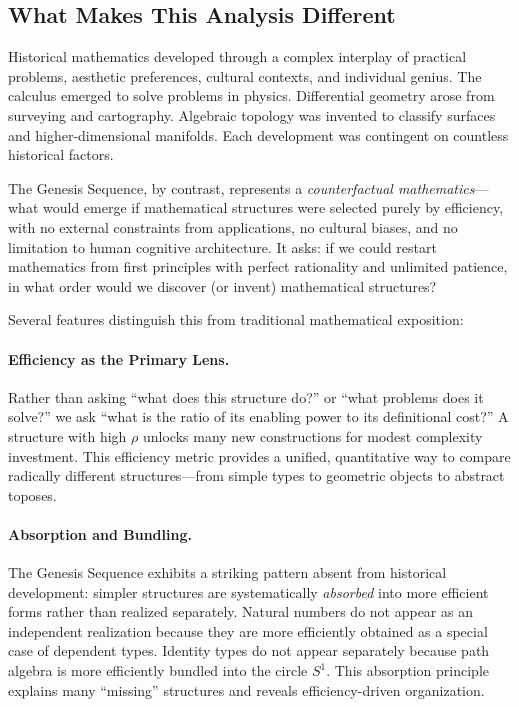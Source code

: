 \documentclass[11pt]{article}
\theoremstyle{definition}
\begin{document}
\subsection{What Makes This Analysis Different}

Historical mathematics developed through a complex interplay of practical problems, aesthetic preferences, cultural contexts, and individual genius. The calculus emerged to solve problems in physics. Differential geometry arose from surveying and cartography. Algebraic topology was invented to classify surfaces and higher-dimensional manifolds. Each development was contingent on countless historical factors.

The Genesis Sequence, by contrast, represents a \emph{counterfactual mathematics}—what would emerge if mathematical structures were selected purely by efficiency, with no external constraints from applications, no cultural biases, and no limitation to human cognitive architecture. It asks: if we could restart mathematics from first principles with perfect rationality and unlimited patience, in what order would we discover (or invent) mathematical structures?

Several features distinguish this from traditional mathematical exposition:

\paragraph{Efficiency as the Primary Lens.}

Rather than asking ``what does this structure do?'' or ``what problems does it solve?'' we ask ``what is the ratio of its enabling power to its definitional cost?'' A structure with high $\rho$ unlocks many new constructions for modest complexity investment. This efficiency metric provides a unified, quantitative way to compare radically different structures—from simple types to geometric objects to abstract toposes.

\paragraph{Absorption and Bundling.}

The Genesis Sequence exhibits a striking pattern absent from historical development: simpler structures are systematically \emph{absorbed} into more efficient forms rather than realized separately. Natural numbers do not appear as an independent realization because they are more efficiently obtained as a special case of dependent types. Identity types do not appear separately because path algebra is more efficiently bundled into the circle $S^1$. This absorption principle explains many ``missing'' structures and reveals efficiency-driven organization.
\end{document}
